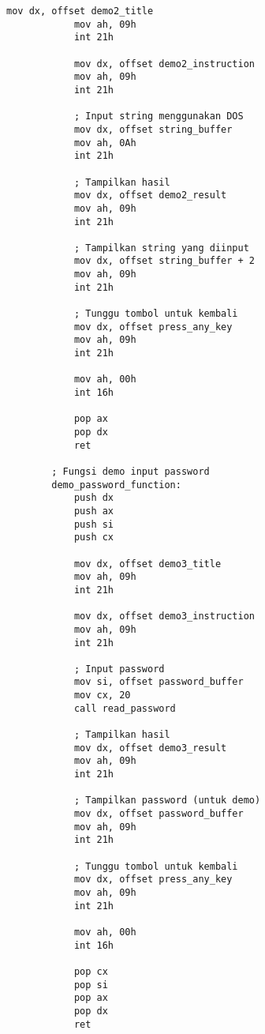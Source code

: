 \documentclass[../main.tex]{subfiles}
\begin{document}
\begin{lstlisting}[language={[x86masm]Assembler}, caption=Program Lengkap - Keyboard Input Demo, label={lst:complete-demo}]
            mov dx, offset demo2_title
            mov ah, 09h
            int 21h
            
            mov dx, offset demo2_instruction
            mov ah, 09h
            int 21h
            
            ; Input string menggunakan DOS
            mov dx, offset string_buffer
            mov ah, 0Ah
            int 21h
            
            ; Tampilkan hasil
            mov dx, offset demo2_result
            mov ah, 09h
            int 21h
            
            ; Tampilkan string yang diinput
            mov dx, offset string_buffer + 2
            mov ah, 09h
            int 21h
            
            ; Tunggu tombol untuk kembali
            mov dx, offset press_any_key
            mov ah, 09h
            int 21h
            
            mov ah, 00h
            int 16h
            
            pop ax
            pop dx
            ret
        
        ; Fungsi demo input password
        demo_password_function:
            push dx
            push ax
            push si
            push cx
            
            mov dx, offset demo3_title
            mov ah, 09h
            int 21h
            
            mov dx, offset demo3_instruction
            mov ah, 09h
            int 21h
            
            ; Input password
            mov si, offset password_buffer
            mov cx, 20
            call read_password
            
            ; Tampilkan hasil
            mov dx, offset demo3_result
            mov ah, 09h
            int 21h
            
            ; Tampilkan password (untuk demo)
            mov dx, offset password_buffer
            mov ah, 09h
            int 21h
            
            ; Tunggu tombol untuk kembali
            mov dx, offset press_any_key
            mov ah, 09h
            int 21h
            
            mov ah, 00h
            int 16h
            
            pop cx
            pop si
            pop ax
            pop dx
            ret
        

\end{lstlisting}
\end{document}
